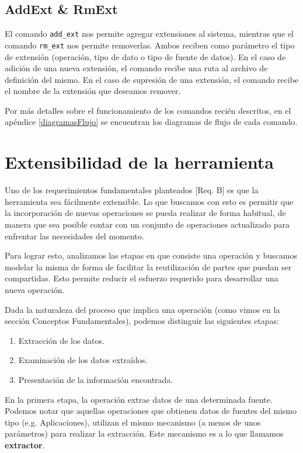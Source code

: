\subsection*{AddExt \& RmExt}
El comando \texttt{add\_ext} nos permite agregar extensiones al sistema, mientras que el comando \texttt{rm\_ext} nos permite removerlas. Ambos reciben como parámetro el tipo de extensión (operación, tipo de dato o tipo de fuente de datos). En el caso de adición de una nueva extensión, el comando recibe una ruta al archivo de definición del mismo. En el caso de supresión de una extensión, el comando recibe el nombre de la extensión que deseamos remover.
\newline

Por más detalles sobre el funcionamiento de los comandos recién descritos, en el apéndice \ref{diagramasFlujo} se encuentran los diagramas de flujo de cada comando.

\section{Extensibilidad de la herramienta}
\label{extensibilidadDeLaHerramienta}
Uno de los requerimientos fundamentales planteados [Req. B] es que la herramienta sea fácilmente extensible. Lo que buscamos con esto es permitir que la incorporación de nuevas operaciones se pueda realizar de forma habitual, de manera que sea posible contar con un conjunto de operaciones actualizado para enfrentar las necesidades del momento.

Para lograr esto, analizamos las etapas en que consiste una operación y buscamos modelar la misma de forma de facilitar la reutilización de partes que puedan ser compartidas. Esto permite reducir el esfuerzo requerido para desarrollar una nueva operación.

Dada la naturaleza del proceso que implica una operación (como vimos en la sección Conceptos Fundamentales), podemos distinguir las siguientes etapas:
\begin{enumerate}
\item Extracción de los datos.
\item Examinación de los datos extraídos.
\item Presentación de la información encontrada.
\end{enumerate}

En la primera etapa, la operación extrae datos de una determinada fuente. Podemos notar que aquellas operaciones que obtienen datos de fuentes del mismo tipo (e.g. Aplicaciones), utilizan el mismo mecanismo (a menos de unos parámetros) para realizar la extracción. Este mecanismo es a lo que llamamos \textbf{extractor}.

